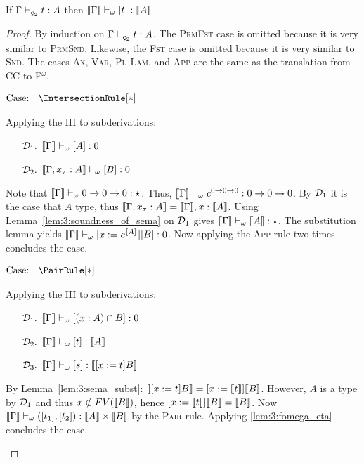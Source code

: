 \begin{theorem}
    \label{lem:3:soundness}
    If $\Gamma \vdash_{\ced} t : A$ then $\llbracket \Gamma \rrbracket \vdash_\omega [t] : \llbracket A \rrbracket$
\end{theorem}
\begin{proof}
    By induction on $\Gamma \vdash_{\ced} t : A$.
    The \textsc{PrmFst} case is omitted because it is very similar to \textsc{PrmSnd}.
    Likewise, the \textsc{Fst} case is omitted because it is very similar to \textsc{Snd}.
    The cases \textsc{Ax}, \textsc{Var}, \textsc{Pi}, \textsc{Lam}, and \textsc{App} are the same as the translation from CC to F$^\omega$.

    $\text{Case: }\begin{array}{c} \IntersectionRule[*] \end{array}$
    \begin{proofcase}
        Applying the IH to subderivations:
        \begin{enumerate}
            \item[$\mathcal{D}_{1}.$] $\llbracket \Gamma \rrbracket \vdash_\omega [A] : 0$
            \item[$\mathcal{D}_{2}.$] $\llbracket \Gamma, x_\tau : A \rrbracket \vdash_\omega [B] : 0$
        \end{enumerate}
        Note that $\llbracket \Gamma \rrbracket \vdash_\omega 0 \to 0 \to 0 : \star$.
        Thus, $\llbracket \Gamma \rrbracket \vdash_\omega c^{0 \to 0 \to 0} : 0 \to 0 \to 0$.
        By $\mathcal{D}_{1}$ it is the case that $A$ type, thus $\llbracket \Gamma, x_\tau : A \rrbracket = \llbracket \Gamma \rrbracket, x : \llbracket A \rrbracket$.
        Using Lemma~\ref{lem:3:soundness_of_sema} on $\mathcal{D}_{1}$ gives $\llbracket \Gamma \rrbracket \vdash_\omega \llbracket A \rrbracket : \star$.
        The substitution lemma yields $\llbracket \Gamma \rrbracket \vdash_\omega [x := c^{\llbracket A \rrbracket}][B] : 0$.
        Now applying the \textsc{App} rule two times concludes the case.
    \end{proofcase}

    $\text{Case: }\begin{array}{c} \PairRule[*] \end{array}$
    \begin{proofcase}
        Applying the IH to subderivations:
        \begin{enumerate}
            \item[$\mathcal{D}_{1}.$] $\llbracket \Gamma \rrbracket \vdash_\omega [(x : A) \cap B] : 0$
            \item[$\mathcal{D}_{2}.$] $\llbracket \Gamma \rrbracket \vdash_\omega [t] : \llbracket A \rrbracket$
            \item[$\mathcal{D}_{3}.$] $\llbracket \Gamma \rrbracket \vdash_\omega [s] : \llbracket [x := t]B \rrbracket$
        \end{enumerate}
        By Lemma~\ref{lem:3:sema_subst}: $\llbracket [x := t]B \rrbracket = [x := \llbracket t \rrbracket]\llbracket B \rrbracket$.
        However, $A$ is a type by $\mathcal{D}_{1}$ and thus $x \notin FV(\llbracket B \rrbracket)$, hence $[x := \llbracket t \rrbracket]\llbracket B \rrbracket = \llbracket B \rrbracket$.
        Now $\llbracket \Gamma \rrbracket \vdash_\omega ([t_1], [t_2]) : \llbracket A \rrbracket \times \llbracket B \rrbracket$ by the \textsc{Pair} rule.
        Applying \ref{lem:3:fomega_eta} concludes the case.
    \end{proofcase}


\end{proof}

